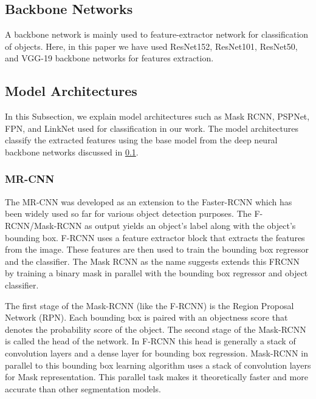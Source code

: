 \documentclass[a4paper,12pt]{spieman}  %
\begin{document}
\begin{spacing}{1}
\subsection{Backbone Networks}
\label{BNs}
A backbone network is mainly used to feature-extractor network for classification of objects. Here, in this paper we have used ResNet152\citep{he2016deep}, ResNet101\citep{Xie2016}, ResNet50, and VGG-19\citep{simonyan2014very} backbone networks for features extraction.
\subsection{Model Architectures}
In this Subsection, we explain model architectures such as Mask RCNN, PSPNet, FPN, and LinkNet used for classification in our work. The model architectures classify the extracted features using the base model from the deep neural backbone networks discussed in \ref{BNs}.
\subsubsection{MR-CNN}
The MR-CNN \citep{7900179} was developed as an extension to the Faster-RCNN \citep{ren2015faster} which has been widely used so far for various object detection purposes. The F-RCNN/Mask-RCNN as output yields an object’s label along with the object’s bounding box. F-RCNN uses a feature extractor block that extracts the features from the image. These features are then used to train the bounding box regressor and the classifier. The Mask RCNN as the name suggests extends this FRCNN by training a binary mask in parallel with the bounding box regressor and object classifier.
\par The first stage of the Mask-RCNN (like the F-RCNN) is the Region Proposal Network (RPN). Each bounding box is paired with an objectness score that denotes the probability score of the object. The second stage of the Mask-RCNN is called the head of the network. In F-RCNN this head is generally a stack of convolution layers and a dense layer for bounding box regression. Mask-RCNN in parallel to this bounding box learning algorithm uses a stack of convolution layers for Mask representation. This parallel task makes it theoretically faster and more accurate than other segmentation models.

\end{spacing}
\end{document}
